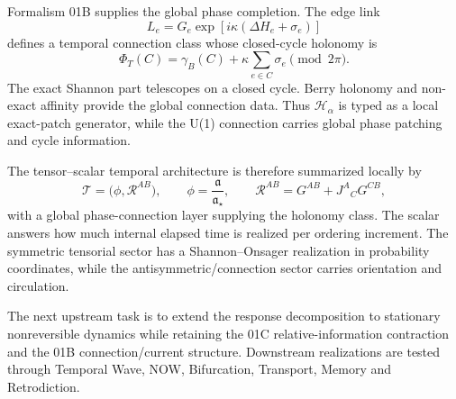 Formalism 01B supplies the global phase completion. The edge link
\[
L_e=G_e\exp\!\left[i\kappa(\Delta H_e+\sigma_e)\right]
\]
defines a temporal connection class whose closed-cycle holonomy is
\[
\boxed{
\Phi_T(C)=\gamma_B(C)+\kappa\sum_{e\in C}\sigma_e\pmod{2\pi}.
}
\]
The exact Shannon part telescopes on a closed cycle. Berry holonomy and non-exact affinity provide the global connection data. Thus \(\mathcal H_\alpha\) is typed as a local exact-patch generator, while the U(1) connection carries global phase patching and cycle information.

The tensor--scalar temporal architecture is therefore summarized locally by
\[
\boxed{
\mathcal T
=\bigl(\phi,\mathcal R^{AB}\bigr),
\qquad
\phi=\frac{\mathfrak a}{\mathfrak a_\star},
\qquad
\mathcal R^{AB}=G^{AB}+J^A{}_{C}G^{CB},
}
\]
with a global phase-connection layer supplying the holonomy class. The scalar answers how much internal elapsed time is realized per ordering increment. The symmetric tensorial sector has a Shannon--Onsager realization in probability coordinates, while the antisymmetric/connection sector carries orientation and circulation.

The next upstream task is to extend the response decomposition to stationary nonreversible dynamics while retaining the 01C relative-information contraction and the 01B connection/current structure. Downstream realizations are tested through Temporal Wave, NOW, Bifurcation, Transport, Memory and Retrodiction.

